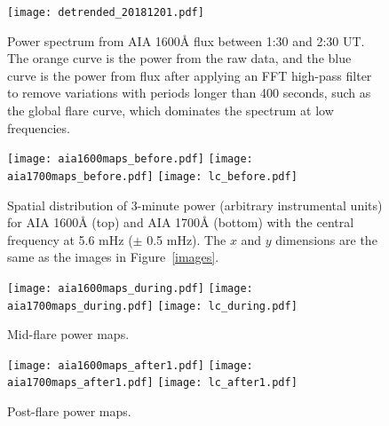 
\begin{figure}[htb!]\centering
    \texttt{[image: detrended\_20181201.pdf]}
    \caption{%
        Power spectrum from
        AIA 1600\AA{} flux between 1:30 and 2:30 UT.
        The orange curve is the power from the raw data, and the blue
        curve is the power from flux after applying an FFT high-pass filter
        to remove variations with periods longer than 400 seconds,
        such as the global flare curve, which dominates the spectrum at
        low frequencies.
    \label{detrended}}
\end{figure}





\begin{figure*}[htb!]\centering
    \texttt{[image: aia1600maps\_before.pdf]}
    \texttt{[image: aia1700maps\_before.pdf]}
    \texttt{[image: lc\_before.pdf]}
    \caption{%
        Spatial distribution of 3-minute power (arbitrary instrumental units)
        for AIA 1600\AA{} (top) and AIA 1700\AA{} (bottom)
        with the central frequency at 5.6 mHz ($\pm$ 0.5 mHz).
        The $x$ and $y$ dimensions are the same as the images in
        Figure~\ref{images}.
    \label{powermaps}}
\end{figure*}

\begin{figure*}[htb!]\centering
    \texttt{[image: aia1600maps\_during.pdf]}
    \texttt{[image: aia1700maps\_during.pdf]}
    \texttt{[image: lc\_during.pdf]}
    \caption{%
        Mid-flare power maps.
    \label{powermaps_during}}
\end{figure*}

\begin{figure*}[htb!]\centering
    \texttt{[image: aia1600maps\_after1.pdf]}
    \texttt{[image: aia1700maps\_after1.pdf]}
    \texttt{[image: lc\_after1.pdf]}
    \caption{%
        Post-flare power maps.
    \label{powermaps_after1}}
\end{figure*}

